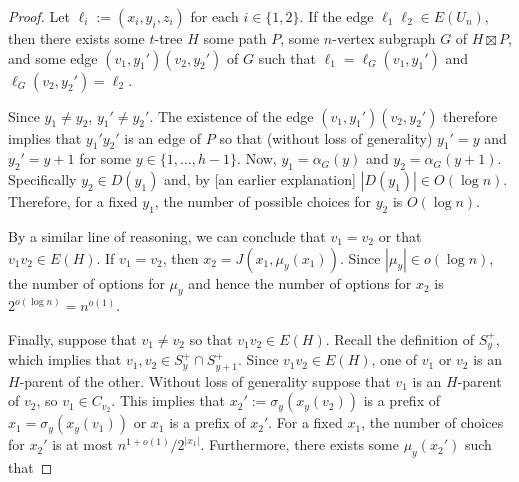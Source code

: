 \documentclass{patmorin}
\begin{document}
\begin{proof}
    Let $\ell_i:=(x_i,y_i,z_i)$ for each $i\in\{1,2\}$.  If the edge $\ell_1\ell_2\in E(U_n)$, then there exists some $t$-tree $H$ some path $P$, some $n$-vertex subgraph $G$ of $H\boxtimes P$, and some edge $(v_1,y_1')(v_2,y_2')$ of $G$ such that $\ell_1=\ell_G(v_1,y_1')$ and $\ell_G(v_2,y_2')=\ell_2$.

    Since $y_1\neq y_2$, $y_1'\neq y_2'$.
    The existence of the edge $(v_1,y_1')(v_2,y_2')$ therefore implies that $y_1'y_2'$ is an edge of $P$ so that (without loss of generality) $y_1'=y$ and $y_2'=y+1$ for some $y\in\{1,\ldots,h-1\}$.  Now, $y_1=\alpha_G(y)$ and $y_2=\alpha_G(y+1)$.  Specifically $y_2\in D(y_1)$ and, by [an earlier explanation] $|D(y_1)|\in O(\log n)$.  Therefore, for a fixed $y_1$, the number of possible choices for $y_2$ is $O(\log n)$.

    By a similar line of reasoning, we can conclude that $v_1=v_2$ or that $v_1v_2\in E(H)$.  If $v_1=v_2$, then $x_2=J(x_1,\mu_y(x_1))$. Since $|\mu_y|\in o(\log n)$, the number of options for $\mu_y$ and hence the number of options for $x_2$ is $2^{o(\log n)}=n^{o(1)}$.

    Finally, suppose that $v_1\neq v_2$ so that $v_1v_2\in E(H)$.  Recall the definition of $S^+_y$, which implies that $v_1,v_2\in S^+_y\cap S^+_{y+1}$.  Since $v_1v_2\in E(H)$, one of $v_1$ or $v_2$ is an $H$-parent of the other. Without loss of generality suppose that $v_1$ is an $H$-parent of $v_2$, so $v_1\in C_{v_2}$.  This implies that $x_2':=\sigma_y(x_y(v_2))$ is a prefix of $x_1=\sigma_y(x_y(v_1))$ or $x_1$ is a prefix of $x_2'$.  For a fixed $x_1$, the number of choices for $x_2'$ is at most $n^{1+o(1)}/2^{|x_1|}$. Furthermore, there exists some $\mu_y(x_2')$ such that


\end{proof}





\end{document}
